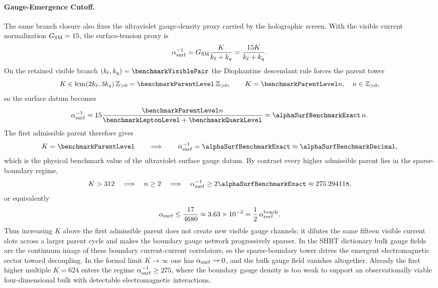 \documentclass[11pt]{article}
\begin{document}
\paragraph{Gauge-Emergence Cutoff.}
The same branch closure also fixes the ultraviolet gauge-density proxy carried by the holographic screen. With the visible current normalization $G_{\rm SM}=15$, the surface-tension proxy is
\begin{equation}
\label{eq:gravity-surface-gauge-proxy}
 \alpha^{-1}_{\rm surf}
 =
 G_{\rm SM}\frac{K}{k_{\ell}+k_q}
 =
 \frac{15K}{k_{\ell}+k_q}.
\end{equation}
On the retained visible branch $(k_{\ell},k_q)=\benchmarkVisiblePair$ the Diophantine descendant rule forces the parent tower
\begin{equation}
\label{eq:gravity-parent-tower}
 K\in \operatorname{lcm}(2k_{\ell},3k_q)\,\mathbb Z_{>0}
 =\benchmarkParentLevel\,\mathbb Z_{>0},
 \qquad
 K=\benchmarkParentLevel n,
 \quad n\in\mathbb Z_{>0},
\end{equation}
so the surface datum becomes
\begin{equation}
\label{eq:gravity-surface-gauge-tower}
 \alpha^{-1}_{\rm surf}
 =
 15\frac{\benchmarkParentLevel n}{\benchmarkLeptonLevel+\benchmarkQuarkLevel}
=
 \alphaSurfBenchmarkExact\,n.
\end{equation}
The first admissible parent therefore gives
\begin{equation}
\label{eq:gravity-surface-gauge-benchmark}
 K=\benchmarkParentLevel
 \qquad\Longrightarrow\qquad
 \alpha^{-1}_{\rm surf}
 =
 \alphaSurfBenchmarkExact
 \approx
 \alphaSurfBenchmarkDecimal,
\end{equation}
which is the physical benchmark value of the ultraviolet surface gauge datum. By contrast every higher admissible parent lies in the sparse-boundary regime,
\begin{equation}
\label{eq:gravity-sparse-boundary}
 K>312
 \quad\Longrightarrow\quad
 n\ge 2
 \quad\Longrightarrow\quad
 \alpha^{-1}_{\rm surf}
 \ge
 2\alphaSurfBenchmarkExact
 \approx
 275.294118,
\end{equation}
or equivalently
\begin{equation}
\label{eq:gravity-sparse-boundary-direct}
 \alpha_{\rm surf}
 \le
 \frac{17}{4680}
 \approx
 3.63\times10^{-3}
 =
 \frac12\,\alpha_{\rm surf}^{\rm bench}.
\end{equation}
Thus increasing $K$ above the first admissible parent does not create new visible gauge channels; it dilutes the same fifteen visible current slots across a larger parent cycle and makes the boundary gauge network progressively sparser. In the SHBT dictionary bulk gauge fields are the continuum image of these boundary current-current correlators, so the sparse-boundary tower drives the emergent electromagnetic sector toward decoupling. In the formal limit $K\to\infty$ one has $\alpha_{\rm surf}\to0$, and the bulk gauge field vanishes altogether. Already the first higher multiple $K=624$ enters the regime $\alpha^{-1}_{\rm surf}\ge275$, where the boundary gauge density is too weak to support an observationally viable four-dimensional bulk with detectable electromagnetic interactions.
\end{document}
